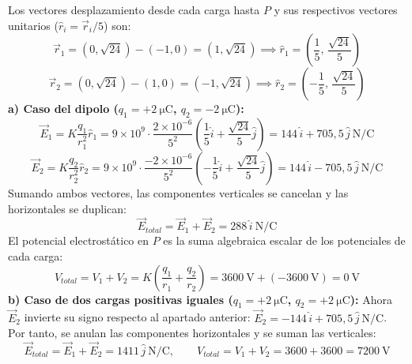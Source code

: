 \begin{ejercicio}
Los vectores desplazamiento desde cada carga hasta $P$ y sus respectivos vectores unitarios ($\hat{r}_i = \vec{r}_i / 5$) son:
\begin{equation}
    \vec{r}_1 = (0, \sqrt{24}) - (-1, 0) = (1, \sqrt{24}) \implies \hat{r}_1 = \left(\frac{1}{5},\, \frac{\sqrt{24}}{5}\right)
\end{equation}
\begin{equation}
    \vec{r}_2 = (0, \sqrt{24}) - (1, 0) = (-1, \sqrt{24}) \implies \hat{r}_2 = \left(-\frac{1}{5},\, \frac{\sqrt{24}}{5}\right)
\end{equation}
\textbf{a) Caso del dipolo ($q_1 = +2\ \si{\micro\coulomb}$, $q_2 = -2\ \si{\micro\coulomb}$):}
\begin{equation}
    \vec{E}_1 = K \frac{q_1}{r_1^2} \hat{r}_1 = 9\times 10^9 \cdot \frac{2\times 10^{-6}}{5^2} \left(\frac{1}{5}\hat{i} + \frac{\sqrt{24}}{5}\hat{j}\right) = 144\,\hat{i} + 705{,}5\,\hat{j}\ \si{\newton\per\coulomb}
\end{equation}
\begin{equation}
    \vec{E}_2 = K \frac{q_2}{r_2^2} \hat{r}_2 = 9\times 10^9 \cdot \frac{-2\times 10^{-6}}{5^2} \left(-\frac{1}{5}\hat{i} + \frac{\sqrt{24}}{5}\hat{j}\right) = 144\,\hat{i} - 705{,}5\,\hat{j}\ \si{\newton\per\coulomb}
\end{equation}
Sumando ambos vectores, las componentes verticales se cancelan y las horizontales se duplican:
\begin{equation}
    \vec{E}_{total} = \vec{E}_1 + \vec{E}_2 = 288\,\hat{i}\ \si{\newton\per\coulomb}
\end{equation}
El potencial electrostático en $P$ es la suma algebraica escalar de los potenciales de cada carga:
\begin{equation}
    V_{total} = V_1 + V_2 = K\left(\frac{q_1}{r_1} + \frac{q_2}{r_2}\right) = 3600\ \si{\volt} + (-3600\ \si{\volt}) = 0\ \si{\volt}
\end{equation}
\textbf{b) Caso de dos cargas positivas iguales ($q_1 = +2\ \si{\micro\coulomb}$, $q_2 = +2\ \si{\micro\coulomb}$):}
Ahora $\vec{E}_2$ invierte su signo respecto al apartado anterior: $\vec{E}_2 = -144\,\hat{i} + 705{,}5\,\hat{j}\ \si{\newton\per\coulomb}$. Por tanto, se anulan las componentes horizontales y se suman las verticales:
\begin{equation}
    \vec{E}_{total} = \vec{E}_1 + \vec{E}_2 = 1411\,\hat{j}\ \si{\newton\per\coulomb}, \qquad V_{total} = V_1 + V_2 = 3600 + 3600 = 7200\ \si{\volt}
\end{equation}
\end{ejercicio}

